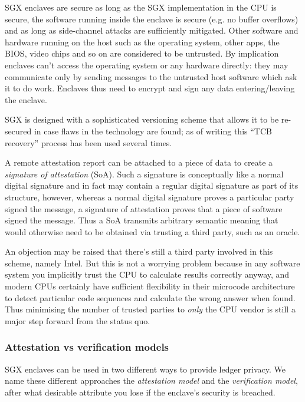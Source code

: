 \documentclass{article}
\begin{document}
SGX enclaves are secure as long as the SGX implementation in the CPU is secure, the software running inside the
enclave is secure (e.g. no buffer overflows) and as long as side-channel attacks are sufficiently mitigated. Other
software and hardware running on the host such as the operating system, other apps, the BIOS, video chips and so on
are considered to be untrusted. By implication enclaves can't access the operating system or any hardware directly:
they may communicate only by sending messages to the untrusted host software which ask it to do work. Enclaves thus
need to encrypt and sign any data entering/leaving the enclave.

SGX is designed with a sophisticated versioning scheme that allows it to be re-secured in case flaws in the
technology are found; as of writing this ``TCB recovery'' process has been used several times.

A remote attestation report can be attached to a piece of data to create a \emph{signature of attestation} (SoA).
Such a signature is conceptually like a normal digital signature and in fact may contain a regular digital signature
as part of its structure, however, whereas a normal digital signature proves a particular party signed the message,
a signature of attestation proves that a piece of software signed the message. Thus a SoA transmits arbitrary
semantic meaning that would otherwise need to be obtained via trusting a third party, such as an oracle.

An objection may be raised that there's still a third party involved in this scheme, namely Intel. But this
is not a worrying problem because in any software system you implicitly trust the CPU to calculate results
correctly anyway, and modern CPUs certainly have sufficient flexibility in their microcode architecture to detect
particular code sequences and calculate the wrong answer when found. Thus minimising the number of trusted parties
to \emph{only} the CPU vendor is still a major step forward from the status quo.

\subsubsection{Attestation vs verification models}

SGX enclaves can be used in two different ways to provide ledger privacy. We name these different approaches the
\emph{attestation model} and the \emph{verification model}, after what desirable attribute you lose if the
enclave's security is breached.
\end{document}

